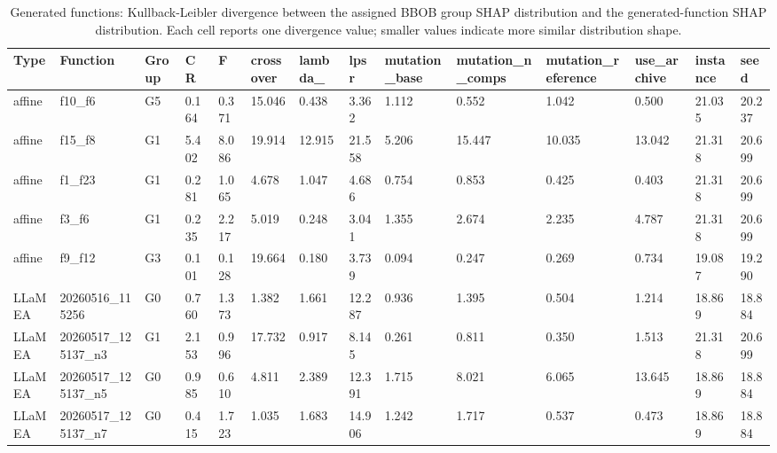 \begin{table}[htbp]
\centering
\scriptsize
\setlength{\tabcolsep}{1.5pt}
\renewcommand{\arraystretch}{0.88}
\caption{Generated functions: Kullback-Leibler divergence between the assigned BBOB group SHAP distribution and the generated-function SHAP distribution. Each cell reports one divergence value; smaller values indicate more similar distribution shape.}
\label{tab:generated-shap-shape-kl-0307}
\begin{adjustbox}{width=\textwidth,center}
\begin{tabular}{llllllllllllll}
\toprule
Type & Function & Group & CR & F & crossover & lambda\_ & lpsr & mutation\_base & mutation\_n\_comps & mutation\_reference & use\_archive & instance & seed \\
\midrule
affine & f10\_f6 & G5 & 0.164 & 0.371 & 15.046 & 0.438 & 3.362 & 1.112 & 0.552 & 1.042 & 0.500 & 21.035 & 20.237 \\
affine & f15\_f8 & G1 & 5.402 & 8.086 & 19.914 & 12.915 & 21.558 & 5.206 & 15.447 & 10.035 & 13.042 & 21.318 & 20.699 \\
affine & f1\_f23 & G1 & 0.281 & 1.065 & 4.678 & 1.047 & 4.686 & 0.754 & 0.853 & 0.425 & 0.403 & 21.318 & 20.699 \\
affine & f3\_f6 & G1 & 0.235 & 2.217 & 5.019 & 0.248 & 3.041 & 1.355 & 2.674 & 2.235 & 4.787 & 21.318 & 20.699 \\
affine & f9\_f12 & G3 & 0.101 & 0.128 & 19.664 & 0.180 & 3.739 & 0.094 & 0.247 & 0.269 & 0.734 & 19.087 & 19.290 \\
LLaMEA & 20260516\_115256 & G0 & 0.760 & 1.373 & 1.382 & 1.661 & 12.287 & 0.936 & 1.395 & 0.504 & 1.214 & 18.869 & 18.884 \\
LLaMEA & 20260517\_125137\_n3 & G1 & 2.153 & 0.996 & 17.732 & 0.917 & 8.145 & 0.261 & 0.811 & 0.350 & 1.513 & 21.318 & 20.699 \\
LLaMEA & 20260517\_125137\_n5 & G0 & 0.985 & 0.610 & 4.811 & 2.389 & 12.391 & 1.715 & 8.021 & 6.065 & 13.645 & 18.869 & 18.884 \\
LLaMEA & 20260517\_125137\_n7 & G0 & 0.415 & 1.723 & 1.035 & 1.683 & 14.906 & 1.242 & 1.717 & 0.537 & 0.473 & 18.869 & 18.884 \\
\bottomrule
\end{tabular}
\end{adjustbox}
\end{table}